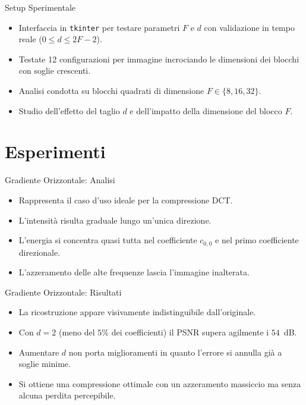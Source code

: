 \documentclass[11pt,aspectratio=169,xcolor=dvipsnames]{beamer}
\begin{document}
\begin{frame}{Setup Sperimentale}
    \begin{itemize}
        \item Interfaccia in \texttt{tkinter} per testare parametri $F$ e $d$ con validazione in tempo reale ($0 \le d \le 2F-2$).
        \item Testate 12 configurazioni per immagine incrociando le dimensioni dei blocchi con soglie crescenti.
        \item Analisi condotta su blocchi quadrati di dimensione $F \in \{8, 16, 32\}$.
        \item Studio dell'effetto del taglio $d$ e dell'impatto della dimensione del blocco $F$.
    \end{itemize}
\end{frame}

\section{Esperimenti}

\begin{frame}{Gradiente Orizzontale: Analisi}
    \begin{itemize}
        \item Rappresenta il caso d'uso ideale per la compressione DCT.
        \item L'intensità risulta graduale lungo un'unica direzione.
        \item L'energia si concentra quasi tutta nel coefficiente $c_{0,0}$ e nel primo coefficiente direzionale.
        \item L'azzeramento delle alte frequenze lascia l'immagine inalterata.
    \end{itemize}
\end{frame}

\begin{frame}{Gradiente Orizzontale: Risultati}
    \begin{itemize}
        \item La ricostruzione appare visivamente indistinguibile dall'originale.
        \item Con $d=2$ (meno del $5\%$ dei coefficienti) il PSNR supera agilmente i $54$~dB.
        \item Aumentare $d$ non porta miglioramenti in quanto l'errore si annulla già a soglie minime.
        \item Si ottiene una compressione ottimale con un azzeramento massiccio ma senza alcuna perdita percepibile.
    \end{itemize}
\end{frame}
\end{document}
